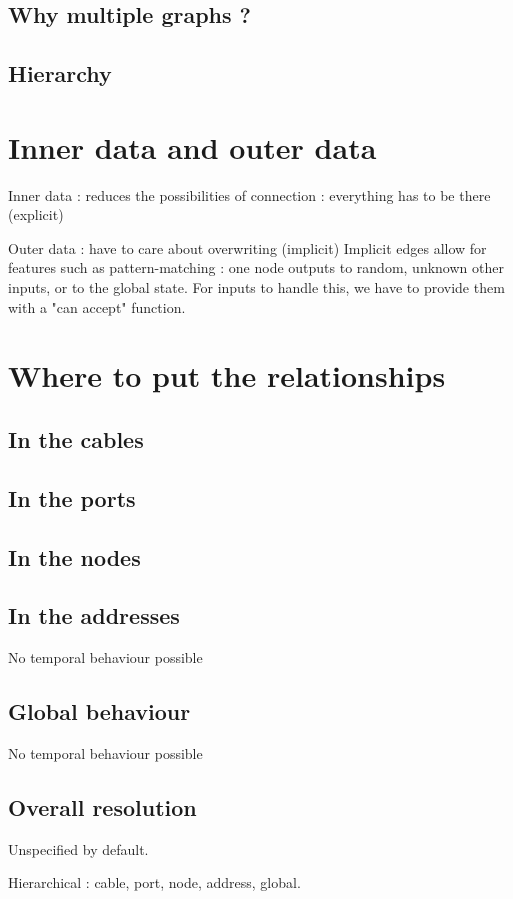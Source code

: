 \documentclass[a4paper,twocolumns]{article}
\begin{document}
	\subsection{Why multiple graphs ?}
	\subsection{Hierarchy}
	
	\section{Inner data and outer data}
	Inner data : reduces the possibilities of connection : everything has to be there (explicit)
	
	Outer data : have to care about overwriting (implicit)
    Implicit edges allow for features such as pattern-matching : one node outputs to random, unknown other inputs, or to 
    the global state.
    For inputs to handle this, we have to provide them with a "can accept" function.
	
    
    \section{Where to put the relationships}
    \subsection{In the cables}
    \subsection{In the ports}
    \subsection{In the nodes}
    \subsection{In the addresses}
    No temporal behaviour possible
    \subsection{Global behaviour}
    No temporal behaviour possible
    \subsection{Overall resolution}
    Unspecified by default. 
    
    Hierarchical : cable, port, node, address, global.
   
\end{document}
